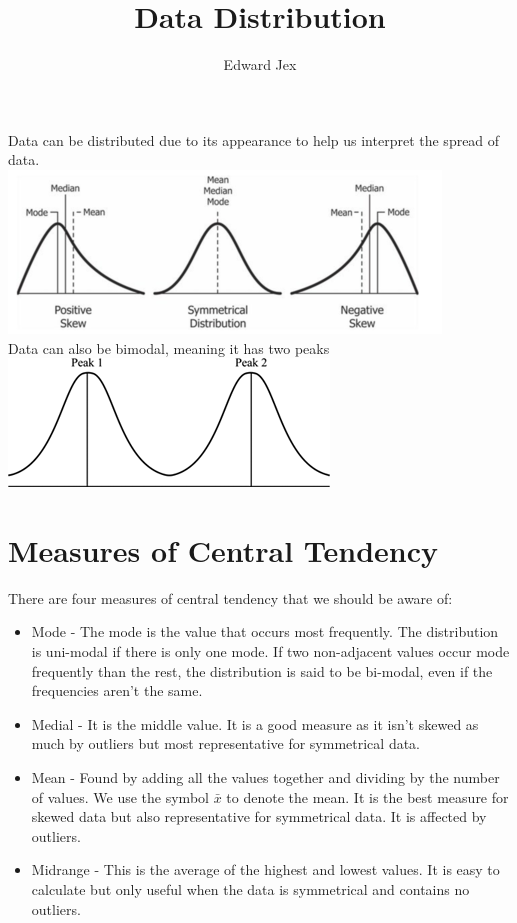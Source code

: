 \documentclass[a4paper,12pt]{article}
\begin{document}
\title{Data Distribution}	
\author{Edward Jex}
\maketitle
Data can be distributed due to its appearance to help us interpret the spread of data. \\
\includegraphics[scale=1.5]{SkewedData} \\
Data can also be bimodal, meaning it has two peaks \\
\includegraphics[scale=0.7]{Bimodal} \\

\section*{Measures of Central Tendency}
There are four measures of central tendency that we should be aware of:
\begin{itemize}
	\item Mode - The mode is the value that occurs most frequently. The distribution is uni-modal if there is only one mode. If two non-adjacent values occur mode frequently than the rest, the distribution is said to be bi-modal, even if the frequencies aren't the same. 
	\item Medial - It is the middle value. It is a good measure as it isn't skewed as much by outliers but most representative for symmetrical data. 
	\item Mean - Found by adding all the values together and dividing by the number of values. We use the symbol $\bar{x}$ to denote the mean. It is the best measure for skewed data but also representative for symmetrical data. It is affected by outliers. 
	\item Midrange - This is the average of the highest and lowest values. It is easy to calculate but only useful when the data is symmetrical and contains no outliers. 
\end{itemize}
\end{document}
